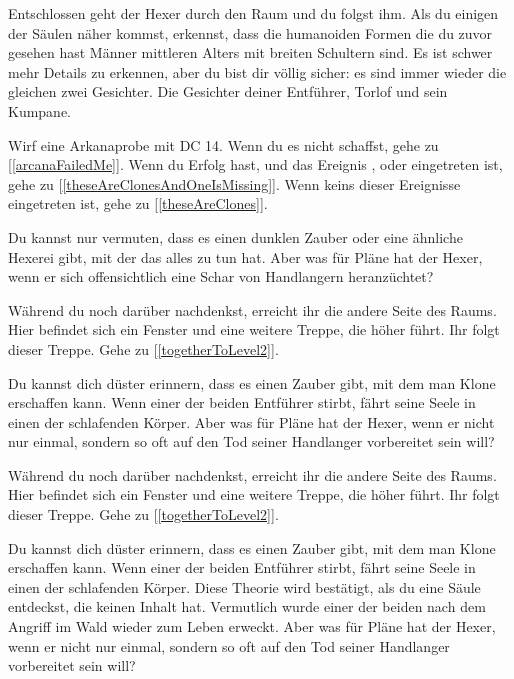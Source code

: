 Entschlossen geht der Hexer durch den Raum und du folgst ihm. Als du einigen der Säulen näher kommst, erkennst, dass die humanoiden Formen die du zuvor gesehen hast Männer mittleren Alters mit breiten Schultern sind. Es ist schwer mehr Details zu erkennen, aber du bist dir völlig sicher: es sind immer wieder die gleichen zwei Gesichter. Die Gesichter deiner Entführer, Torlof und sein Kumpane.

Wirf eine Arkanaprobe mit DC 14. Wenn du es nicht schaffst, gehe zu [\ref{arcanaFailedMe}]. Wenn du Erfolg hast, und das Ereignis ,  oder  eingetreten ist, gehe zu [\ref{theseAreClonesAndOneIsMissing}]. Wenn keins dieser Ereignisse eingetreten ist, gehe zu [\ref{theseAreClones}].


Du kannst nur vermuten, dass es einen dunklen Zauber oder eine ähnliche Hexerei gibt, mit der das alles zu tun hat. Aber was für Pläne hat der Hexer, wenn er sich offensichtlich eine Schar von Handlangern heranzüchtet?

Während du noch darüber nachdenkst, erreicht ihr die andere Seite des Raums. Hier befindet sich ein Fenster und eine weitere Treppe, die höher führt. Ihr folgt dieser Treppe.
Gehe zu [\ref{togetherToLevel2}].


Du kannst dich düster erinnern, dass es einen Zauber gibt, mit dem man Klone erschaffen kann. Wenn einer der beiden Entführer stirbt, fährt seine Seele in einen der schlafenden Körper. Aber was für Pläne hat der Hexer, wenn er nicht nur einmal, sondern so oft auf den Tod seiner Handlanger vorbereitet sein will?

Während du noch darüber nachdenkst, erreicht ihr die andere Seite des Raums. Hier befindet sich ein Fenster und eine weitere Treppe, die höher führt. Ihr folgt dieser Treppe.
Gehe zu [\ref{togetherToLevel2}].


Du kannst dich düster erinnern, dass es einen Zauber gibt, mit dem man Klone erschaffen kann. Wenn einer der beiden Entführer stirbt, fährt seine Seele in einen der schlafenden Körper. Diese Theorie wird bestätigt, als du eine Säule entdeckst, die keinen Inhalt hat. Vermutlich wurde einer der beiden nach dem Angriff im Wald wieder zum Leben erweckt. Aber was für Pläne hat der Hexer, wenn er nicht nur einmal, sondern so oft auf den Tod seiner Handlanger vorbereitet sein will?

